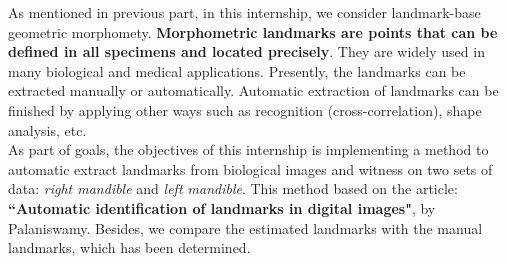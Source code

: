 As mentioned in previous part, in this internship, we consider landmark-base geometric morphomety. \textbf{Morphometric landmarks are points that can be defined in all specimens  and located precisely}\cite{palaniswamy2010automatic}. They are widely used in many biological and medical applications. Presently, the landmarks can be extracted manually or automatically. Automatic extraction of landmarks can be finished by applying other ways such as recognition (cross-correlation), shape analysis, etc.\\[0.2cm]
As part of goals, the objectives of this internship is implementing a method to automatic extract landmarks from biological images and witness on two sets of data: \textit{right mandible} and \textit{left mandible}. This method based on the article: \textbf{``Automatic identification of landmarks in digital images"}, by Palaniswamy\cite{palaniswamy2010automatic}. Besides, we compare the estimated landmarks with the manual landmarks, which has been determined.






























